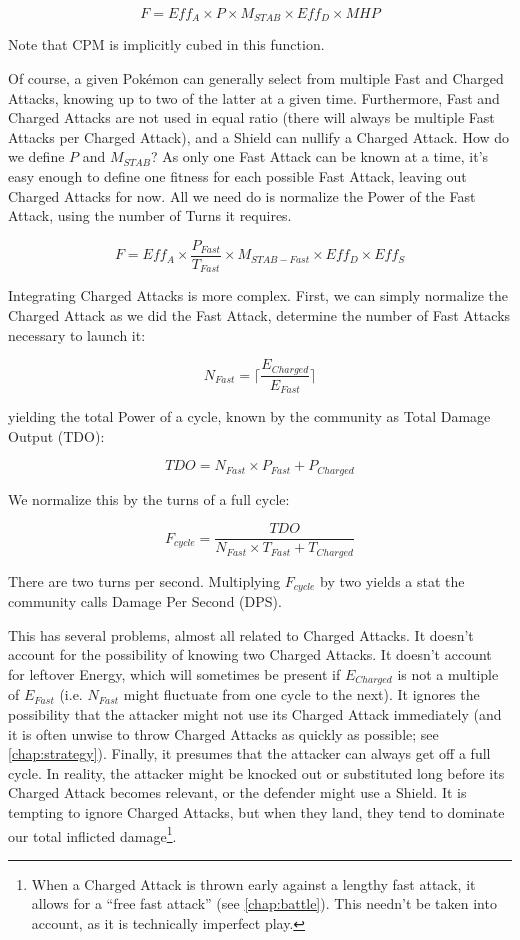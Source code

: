 \[ F = Eff_A \times P \times M_{STAB} \times Eff_D \times MHP \]

Note that CPM is implicitly cubed in this function.

Of course, a given Pokémon can generally select from multiple Fast and Charged Attacks,
  knowing up to two of the latter at a given time.
Furthermore, Fast and Charged Attacks are not used in equal ratio (there will
  always be multiple Fast Attacks per Charged Attack), and a Shield can
  nullify a Charged Attack.
How do we define $P$ and $M_{STAB}$?
As only one Fast Attack can be known at a time, it's easy enough to define one
  fitness for each possible Fast Attack, leaving out Charged Attacks for now.
All we need do is normalize the Power of the Fast Attack, using the number of
  Turns it requires.

\[ F = Eff_A \times \frac{P_{Fast}}{T_{Fast}} \times M_{STAB-Fast} \times Eff_D \times Eff_S \]

Integrating Charged Attacks is more complex.
First, we can simply normalize the Charged Attack as we did the Fast Attack,
 determine the number of Fast Attacks necessary to launch it:

\[ N_{Fast} = \lceil\frac{E_{Charged}}{E_{Fast}}\rceil \]

yielding the total Power of a cycle, known by the community as Total Damage Output (TDO):

\[ TDO = N_{Fast} \times P_{Fast} + P_{Charged} \]

We normalize this by the turns of a full cycle:

\[ F_{cycle} = \frac{TDO}{N_{Fast} \times T_{Fast} + T_{Charged}} \]

There are two turns per second. Multiplying $F_{cycle}$ by two yields a
  stat the community calls Damage Per Second (DPS).

This has several problems, almost all related to Charged Attacks.
It doesn't account for the possibility of knowing two Charged Attacks.
It doesn't account for leftover Energy, which will sometimes be present if
  $E_{Charged}$ is not a multiple of $E_{Fast}$ (i.e. $N_{Fast}$
  might fluctuate from one cycle to the next).
It ignores the possibility that the attacker might not use its Charged Attack
  immediately (and it is often unwise to throw Charged Attacks as quickly as
  possible; see \autoref{chap:strategy}).
Finally, it presumes that the attacker can always get off a full cycle.
In reality, the attacker might be knocked out or substituted long before its
  Charged Attack becomes relevant, or the defender might use a Shield.
It is tempting to ignore Charged Attacks, but when they land, they tend to
  dominate our total inflicted damage\footnote{When a Charged Attack is thrown
  early against a lengthy fast attack, it allows for a ``free fast attack''
  (see \autoref{chap:battle}). This needn't be taken into account, as it is
  technically imperfect play.}.

